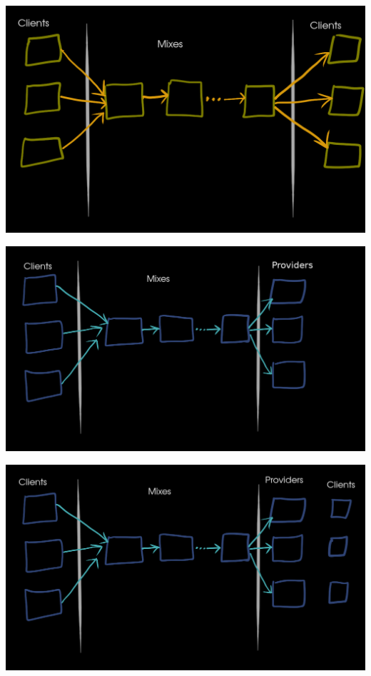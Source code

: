 \documentclass[fleqn,xcolor={usenames,dvipsnames}]{beamer} %
\begin{document}
\begin{frame}
\begin{center}
\includegraphics[scale=.26]{pics/sda2}
\end{center}
\end{frame}

\begin{frame}
\begin{center}
\includegraphics[scale=.24]{pics/sda3}
\end{center}
\end{frame}

\begin{frame}
\begin{center}
\includegraphics[scale=.24]{pics/sda4}
\end{center}
\end{frame}
\end{document}
